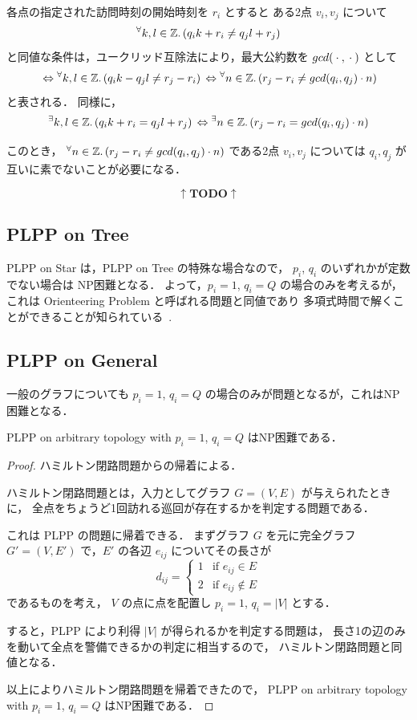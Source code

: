 各点の指定された訪問時刻の開始時刻を $r_i$ とすると
ある2点 $v_i, v_j$ について
\[
	{}^\forall k,l \in \mathbb{Z} .
	\left( q_i k + r_i \neq q_j l + r_j \right)
\]
と同値な条件は，ユークリッド互除法により，最大公約数を $gcd({}\cdot{},{}\cdot{})$ として
\[
	{\;\Leftrightarrow\;} 
	{}^\forall k,l \in \mathbb{Z} .
	\left( q_i k - q_j l \neq r_j - r_i \right)
	{\;\Leftrightarrow\;}
	{}^\forall n \in \mathbb{Z} .
	\left( r_j - r_i \neq gcd(q_i,q_j) \cdot n \right)
\]
と表される．
同様に，
\[
	{}^\exists k,l \in \mathbb{Z} .
	\left( q_i k + r_i = q_j l + r_j \right)
	{\;\Leftrightarrow\;}
	{}^\exists n \in \mathbb{Z} .
	\left( r_j - r_i = gcd(q_i,q_j) \cdot n \right)
\]

このとき，
${}^\forall n \in \mathbb{Z} . \left( r_j - r_i \neq gcd(q_i,q_j) \cdot n \right)$
である2点 $v_i, v_j$ については
$q_i, q_j$ が互いに素でないことが必要になる．




\[ \uparrow  \textbf{TODO} \uparrow \]





\subsection{PLPP on Tree}
PLPP on Star は，PLPP on Tree の特殊な場合なので，
$p_i$, $q_i$ のいずれかが定数でない場合は NP困難となる．
よって，$p_i = 1$, $q_i = Q$ の場合のみを考えるが，
これは Orienteering Problem と呼ばれる問題と同値であり
多項式時間で解くことができることが知られている~\cite{coene2013balancing}.




\subsection{PLPP on General}
一般のグラフについても $p_i = 1$, $q_i = Q$ の場合のみが問題となるが，これはNP困難となる．

\begin{theo}
	PLPP on arbitrary topology with $p_i = 1$, $q_i = Q$ はNP困難である．
\end{theo}
\begin{proof}
ハミルトン閉路問題からの帰着による．

ハミルトン閉路問題とは，入力としてグラフ $G = (V,E)$ が与えられたときに，
全点をちょうど1回訪れる巡回が存在するかを判定する問題である．

これは PLPP の問題に帰着できる．
まずグラフ $G$ を元に完全グラフ $G' = (V,E')$ で，$E'$ の各辺 $e_{ij}$ についてその長さが
\begin{equation}
d_{ij} =
\begin{cases}
	1 & \text{if } e_{ij} \in E \\
	2 & \text{if } e_{ij} \not\in E
\end{cases}
\end{equation}
であるものを考え，
$V$ の点に点を配置し $p_i = 1$, $q_i = |V|$ とする．

すると，PLPP により利得 $|V|$ が得られるかを判定する問題は，
長さ1の辺のみを動いて全点を警備できるかの判定に相当するので，
ハミルトン閉路問題と同値となる．

以上によりハミルトン閉路問題を帰着できたので，
PLPP on arbitrary topology with $p_i = 1$, $q_i = Q$ はNP困難である．
\end{proof}

